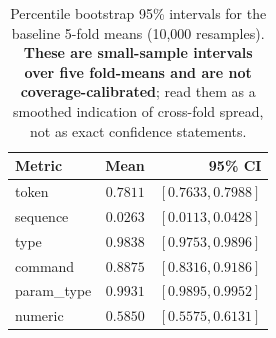 \begin{table}[h]
\centering
\caption{Percentile bootstrap 95\% intervals for the baseline 5-fold means (10{,}000 resamples). \textbf{These are small-sample intervals over five fold-means and are not coverage-calibrated}; read them as a smoothed indication of cross-fold spread, not as exact confidence statements.}
\label{tab:bootstrap_ci}
\begin{tabular}{l r r}
\toprule
Metric & Mean & 95\% CI \\
\midrule
token & $0.7811$ & $[0.7633, 0.7988]$ \\
sequence & $0.0263$ & $[0.0113, 0.0428]$ \\
type & $0.9838$ & $[0.9753, 0.9896]$ \\
command & $0.8875$ & $[0.8316, 0.9186]$ \\
param\_type & $0.9931$ & $[0.9895, 0.9952]$ \\
numeric & $0.5850$ & $[0.5575, 0.6131]$ \\
\bottomrule
\end{tabular}
\end{table}